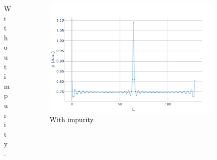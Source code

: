 \documentclass[aspectratio=169]{beamer}
\begin{document}
\begin{frame}
\begin{onlyenv}
\begin{columns}[onlytextwidth]
\begin{column}{0.5\textwidth}
\begin{figure}[ht]
          \caption*{Without impurity.}
        \end{figure}
      \end{column}
      \begin{column}{0.5\textwidth}
        \begin{figure}[ht]
          \centering
          \includegraphics[scale=0.2]{../img/Density-profiles-fractional-impurity.pdf}
          \caption*{With impurity.}
        \end{figure}
      \end{column}
    \end{columns}
  \end{onlyenv}
\end{frame}
\end{document}

